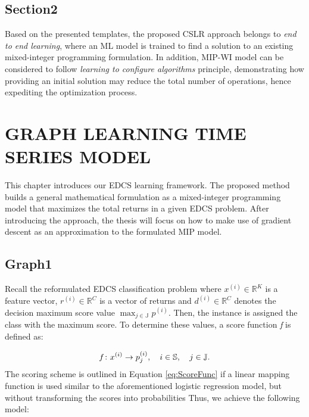 \documentclass[a4paper,onesided,12pt]{report}
\newcommand{\R}{\mathbb{R}}
\begin{document}
\newpage

\section{Section2}
\label{sec:Section2}

Based on the presented templates, the proposed CSLR approach belongs to \emph{end to end learning}, where an ML model is trained to find a solution to an existing mixed-integer programming formulation. In addition, MIP-WI model can be considered to follow \emph{learning to configure algorithms} principle, demonstrating how providing an initial solution may reduce the total number of operations, hence expediting the optimization process.

\chapter{GRAPH LEARNING TIME SERIES MODEL}
\label{sec:graph} 

This chapter introduces our EDCS learning framework. The proposed method builds a general mathematical formulation as a mixed-integer programming model that maximizes the total returns in a given EDCS problem. After introducing the approach, the thesis will focus on how to make use of gradient descent as an approximation to the formulated MIP model.

\section{Graph1}
\label{sec:graph1}

Recall the reformulated EDCS classification problem where $x^{(i)} \in \R^{K}$ is a feature vector, $r^{(i)} \in \R^{C}$ is a vector of returns and $d^{(i)} \in \R^{C}$ denotes the decision maximum score value $\max_{j \in \mathbb{J}} p^{(i)}$. Then, the instance is assigned the class with the maximum score. To determine these values, a score function \emph{f} is defined as:

\begin{equation}
{\label{eq:MapFunction}}
  f \colon x^{(i)} \to p^{(i)}_{j}, \quad i \in \mathbb{S}, \quad j \in \mathbb{J}.
\end{equation}
\indent The scoring scheme is outlined in Equation \ref{eq:ScoreFunc} if a linear mapping function is used similar to the aforementioned logistic regression model, but without transforming the scores into probabilities
\noindent Thus, we achieve the following model:
\end{document}
